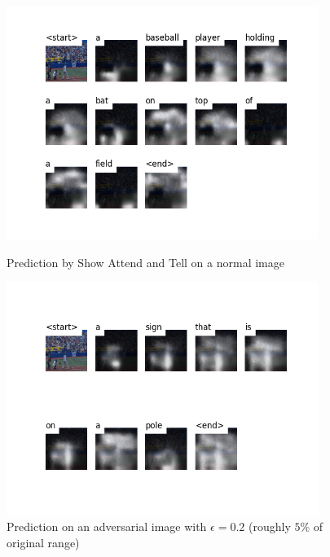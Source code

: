 \begin{figure}
    \centering
    \begin{minipage}{0.45\textwidth}
        \centering
        \includegraphics[width=0.9\textwidth]{figures/caption_baseball_normal.png} %
        \caption{Prediction by Show Attend and Tell on a normal image}
    \end{minipage}\hfill
    \begin{minipage}{0.45\textwidth}
        \centering
        \includegraphics[width=0.9\textwidth]{figures/caption_baseball_adversarial.png} %
        \caption{Prediction on an adversarial image with $\epsilon=0.2$ (roughly $5\%$ of original range)}
    \end{minipage}
\end{figure}


